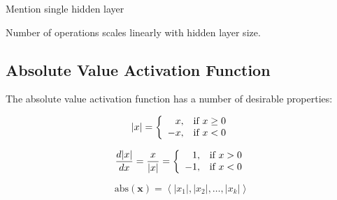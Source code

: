 \documentclass{article}
\begin{document}



Mention single hidden layer

Number of operations scales linearly with hidden layer size.


\subsection{Absolute Value Activation Function}

The absolute value activation function has a number of desirable properties: 

\begin{equation}
|x| =
\left\{
	\begin{array}{ll}
		\hfill x,  & \mbox{if } x \geq 0 \\
		-x, & \mbox{if } x < 0
	\end{array}
\right.
\end{equation}

\begin{equation}
\frac{d|x|}{dx} =
\frac{x}{|x|} =
\left\{
	\begin{array}{ll}
		\hfill 1,  & \mbox{if } x > 0 \\
		-1, & \mbox{if } x < 0
	\end{array}
\right.
\end{equation}

\begin{equation}
\textrm{abs}(\mathbf{x}) = \left \langle |x_1|, |x_2|, \dots , |x_k| \right \rangle
\end{equation}

\end{document}
